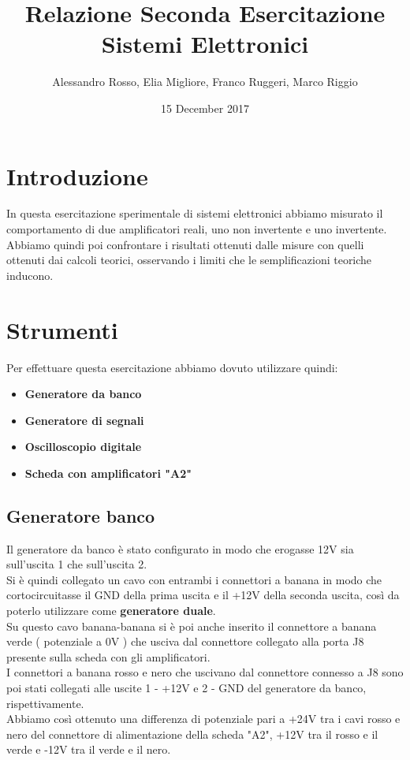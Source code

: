 \documentclass{article}
\author{Alessandro Rosso, Elia Migliore, Franco Ruggeri, Marco Riggio}
\title{Relazione Seconda Esercitazione Sistemi Elettronici}
\date{15 December 2017}
\begin{document}
\section{Introduzione}
In questa esercitazione sperimentale di sistemi elettronici abbiamo misurato il comportamento di due amplificatori reali, uno non invertente e uno invertente.\\Abbiamo quindi poi confrontare i risultati ottenuti dalle misure con quelli ottenuti dai calcoli teorici, osservando i limiti che le semplificazioni teoriche inducono.

\section{Strumenti}
Per effettuare questa esercitazione abbiamo dovuto utilizzare quindi:
\begin{itemize}
	\item \textbf{Generatore da banco}
	\item \textbf{Generatore di segnali}
    \item \textbf{Oscilloscopio digitale}
	\item \textbf{Scheda con amplificatori "A2"}
\end{itemize}

\subsection{Generatore banco}
Il generatore da banco è stato configurato in modo che erogasse 12V sia sull'uscita 1 che sull'uscita 2.\\
Si è quindi collegato un cavo con entrambi i connettori a banana in modo che cortocircuitasse il GND della prima uscita e il +12V della seconda uscita, così da poterlo utilizzare come \textbf{generatore duale}.\\ Su questo cavo banana-banana si è poi anche inserito il connettore a banana verde ( potenziale a 0V ) che usciva dal connettore collegato alla porta J8 presente sulla scheda con gli amplificatori.\\
I connettori a banana rosso e nero che uscivano dal connettore connesso a J8 sono poi stati collegati alle uscite 1 - +12V e 2 - GND del generatore da banco, rispettivamente.\\
Abbiamo così ottenuto una differenza di potenziale pari a +24V tra i cavi rosso e nero del connettore di alimentazione della scheda "A2", +12V tra il rosso e il verde e -12V tra il verde e il nero.
\end{document}
